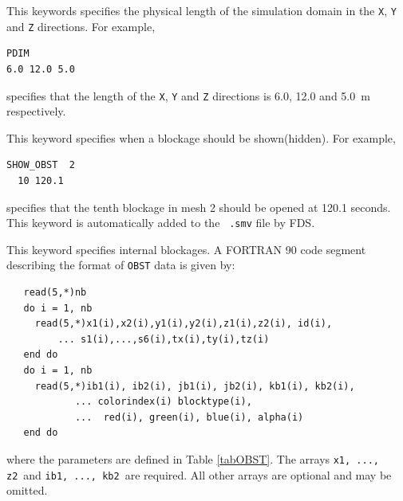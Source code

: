 \documentclass[11pt,twoside]{book}
\newcommand{\fds}{{FDS}}
\newcommand{\hitem}[1]{\item[{\bf #1} \hfill]}
\begin{document}
\hitem{PDIM}This keywords specifies the physical length of the
simulation domain in the {\tt X}, {\tt Y} and {\tt Z} directions.
For example,
\begin{verbatim}
PDIM
6.0 12.0 5.0
\end{verbatim}
specifies that the length of the {\tt X}, {\tt Y} and {\tt Z}
directions is 6.0, 12.0 and 5.0~m respectively.

\hitem{SHOW\_OBST(HIDE\_OBST)} This keyword specifies when a
blockage should be shown(hidden). For example,
\begin{verbatim}
SHOW_OBST  2
  10 120.1
\end{verbatim}
specifies that the tenth blockage in mesh 2 should be opened at
120.1 seconds.  This keyword is automatically added to the {\tt
.smv} file by \fds.

\hitem{OBST}This keyword specifies internal blockages. A
FORTRAN 90 code segment describing the format of {\tt OBST}
data is given by:
\begin{verbatim}
   read(5,*)nb
   do i = 1, nb
     read(5,*)x1(i),x2(i),y1(i),y2(i),z1(i),z2(i), id(i),
         ... s1(i),...,s6(i),tx(i),ty(i),tz(i)
   end do
   do i = 1, nb
     read(5,*)ib1(i), ib2(i), jb1(i), jb2(i), kb1(i), kb2(i),
            ... colorindex(i) blocktype(i),
            ...  red(i), green(i), blue(i), alpha(i)
   end do
\end{verbatim}
where the parameters are defined in Table \ref{tabOBST}.  The arrays {\tt x1, ..., z2}\ and {\tt ib1, ..., kb2}\ are
required. All other arrays are optional and may be omitted.
\end{document}

